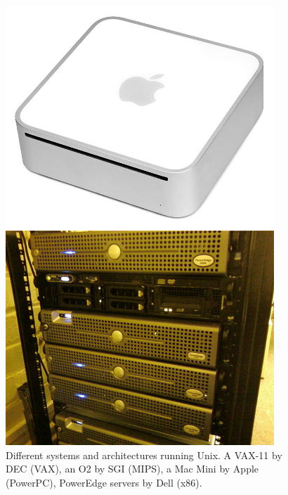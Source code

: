 \begin{figure}[t]
\begin{minipage}{.4\linewidth}
	\end{minipage}
	\\
	\begin{minipage}{.4\linewidth}
		\centering
		\includegraphics[width=0.9\textwidth]{02/pics/Mac-mini-1st-gen}
	\end{minipage}
	\hfill
	\begin{minipage}{.4\linewidth}
		\centering
		\includegraphics[width=0.9\textwidth]{02/pics/Dellpoweredge2950}
	\end{minipage}
	\caption[Different systems running Unix]{
			Different systems and architectures running Unix.
			A VAX-11 by DEC (VAX), an O2 by SGI (MIPS),
			a Mac Mini by Apple (PowerPC), PowerEdge
			servers by Dell (x86).
				\label{fig:portability}}
\end{figure}


